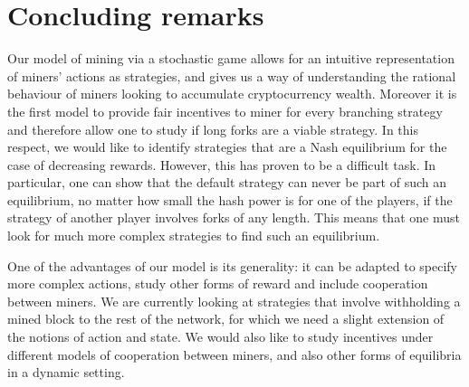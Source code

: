 \section{Concluding remarks}
\label{sec-con-r}

Our model of mining via a stochastic game allows for an intuitive representation of miners' actions as strategies, 
and gives us a way of understanding the rational behaviour of miners looking to accumulate cryptocurrency wealth. Moreover it is the first model to provide fair incentives to miner for every branching strategy and therefore allow one to study if long forks are a viable strategy.
In this respect, we would like to identify strategies that are a Nash equilibrium for the case of decreasing rewards. However, this has proven 
to be a difficult task. In particular, one can show that the default strategy can never be part of such an 
equilibrium, no matter how small the hash power is for one of the players, if the strategy of another player involves forks of any length. 
This means that one must look for much more complex strategies to find such an equilibrium. 

One of the advantages of our model is its generality: it can be adapted to specify more complex 
actions, study other forms of reward and include cooperation between miners. 
We are currently looking at strategies that involve withholding 
a mined block to the rest of the network, for which we need a slight extension of the notions of action and state. 
We would also like to study incentives under different models of cooperation between miners, and 
also other forms of equilibria in a dynamic setting. 

